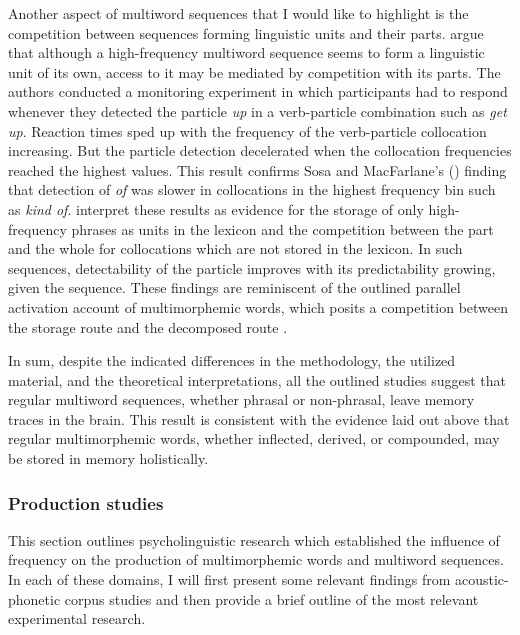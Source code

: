 Another aspect of multiword sequences that I would like to highlight is the competition between sequences forming linguistic units and their parts. \citet{kapatsinski-radicke} argue that although a high-frequency multiword sequence seems to form a linguistic unit of its own, access to it may be mediated by competition with its parts. The authors conducted a monitoring experiment in which participants had to respond whenever they detected the particle \textit{up} in a verb-particle combination such as \textit{get up}. Reaction times sped up with the frequency of the verb-particle collocation increasing. But the particle detection decelerated when the collocation frequencies reached the highest values. This result confirms Sosa and MacFarlane's (\citeyear{sosa-macfarlane}) finding that detection of \textit{of} was slower in collocations in the highest frequency bin such as \textit{kind of}. \citeauthor{kapatsinski-radicke} interpret these results as evidence for the storage of only high-frequency phrases as units in the lexicon and the competition between the part and the whole for collocations which are not stored in the lexicon. In such sequences, detectability of the particle improves with its predictability growing, given the sequence. These findings are reminiscent of the outlined parallel activation account of multimorphemic words, which posits a competition between the storage route and the decomposed route \citep{baayen-dijkstra-schreuder,hay-2001}.

In sum, despite the indicated differences in the methodology, the utilized material, and the theoretical interpretations, all the outlined studies suggest that regular multiword sequences, whether phrasal or non-phrasal, leave memory traces in the brain. This result is consistent with the evidence laid out above that regular multimorphemic words, whether inflected, derived, or compounded, may be stored in memory holistically.

\subsubsection{Production studies}\largerpage

This section outlines psycholinguistic research which established the influence of frequency on the production of multimorphemic words and multiword sequences. In each of these domains, I will first present some relevant findings from acoustic-phonetic corpus studies and then provide a brief outline of the most relevant experimental research. 


